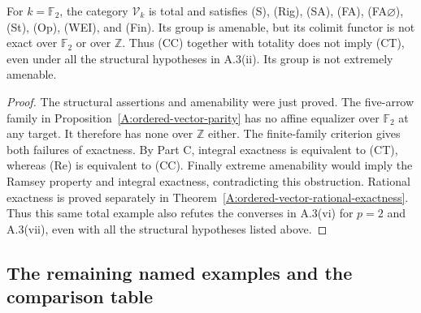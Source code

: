 \begin{corollary}
\label{A:ordered-vector-counterexample}
For $k=\mathbb F_2$, the category $\mathcal V_k$ is total and satisfies
(S), (Rig), (SA), (FA), (FA$\varnothing$), (St), (Op), (WEI), and (Fin).
Its group is amenable, but its colimit functor is not exact over
$\mathbb F_2$ or over $\mathbb Z$. Thus (CC) together with totality
does not imply (CT), even under all the structural hypotheses in
A.3(ii). Its group is not extremely amenable.
\end{corollary}
\begin{proof}
The structural assertions and amenability were just proved. The
five-arrow family in Proposition~\ref{A:ordered-vector-parity} has no
affine equalizer over $\mathbb F_2$ at any target. It therefore has
none over $\mathbb Z$ either. The finite-family criterion gives both
failures of exactness. By Part C, integral exactness is equivalent
to (CT), whereas (Re) is equivalent to (CC). Finally extreme
amenability would imply the Ramsey property and integral exactness,
contradicting this obstruction. Rational exactness is proved separately
in Theorem~\ref{A:ordered-vector-rational-exactness}. Thus this same
total example also refutes the converses in A.3(vi) for $p=2$ and
A.3(vii), even with all the structural hypotheses listed above.
\end{proof}

\subsection{The remaining named examples and the comparison table}

